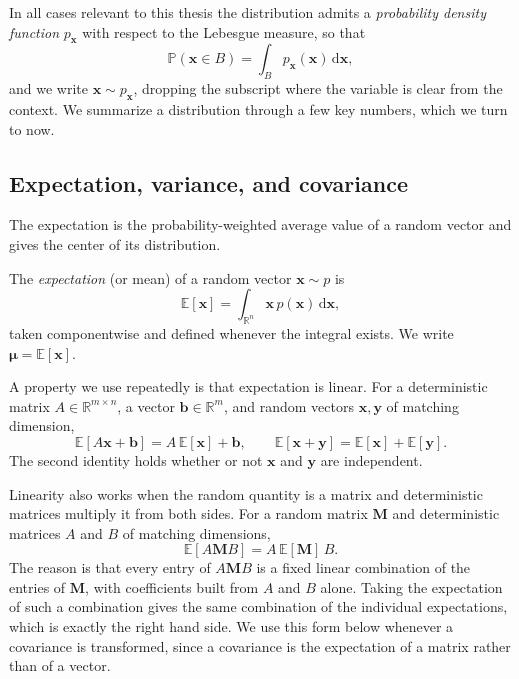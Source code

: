 In all cases relevant to this thesis the distribution admits a \emph{probability density function} $p_{\mathbf{x}}$ with respect to the Lebesgue measure, so that
\begin{equation}\label{eq:density}
    \mathbb{P}(\mathbf{x} \in B) = \int_B p_{\mathbf{x}}(\mathbf{x})\, \mathrm{d}\mathbf{x},
\end{equation}
and we write $\mathbf{x} \sim p_{\mathbf{x}}$, dropping the subscript where the variable is clear from the context. We summarize a distribution through a few key numbers, which we turn to now.

\subsection{Expectation, variance, and covariance}
The expectation is the probability-weighted average value of a random vector and gives the center of its distribution.

\begin{definition}[Expectation]\label{def:expectation}
The \emph{expectation} (or mean) of a random vector $\mathbf{x} \sim p$ is
\begin{equation}\label{eq:expectation}
    \mathbb{E}[\mathbf{x}] = \int_{\mathbb{R}^n} \mathbf{x}\, p(\mathbf{x})\, \mathrm{d}\mathbf{x},
\end{equation}
taken componentwise and defined whenever the integral exists. We write $\boldsymbol{\mu} = \mathbb{E}[\mathbf{x}]$.
\end{definition}

A property we use repeatedly is that expectation is linear. For a deterministic matrix $A \in \mathbb{R}^{m \times n}$, a vector $\mathbf{b} \in \mathbb{R}^m$, and random vectors $\mathbf{x}, \mathbf{y}$ of matching dimension,
\begin{equation}\label{eq:linearity_expectation}
    \mathbb{E}[A\mathbf{x} + \mathbf{b}] = A\,\mathbb{E}[\mathbf{x}] + \mathbf{b}, \qquad
    \mathbb{E}[\mathbf{x} + \mathbf{y}] = \mathbb{E}[\mathbf{x}] + \mathbb{E}[\mathbf{y}].
\end{equation}
The second identity holds whether or not $\mathbf{x}$ and $\mathbf{y}$ are independent.

Linearity also works when the random quantity is a matrix and deterministic matrices multiply it from both sides. For a random matrix $\mathbf{M}$ and deterministic matrices $A$ and $B$ of matching dimensions,
\begin{equation}\label{eq:linearity_matrix}
    \mathbb{E}[A\mathbf{M}B] = A\,\mathbb{E}[\mathbf{M}]\,B.
\end{equation}
The reason is that every entry of $A\mathbf{M}B$ is a fixed linear combination of the entries of $\mathbf{M}$, with coefficients built from $A$ and $B$ alone. Taking the expectation of such a combination gives the same combination of the individual expectations, which is exactly the right hand side. We use this form below whenever a covariance is transformed, since a covariance is the expectation of a matrix rather than of a vector.

